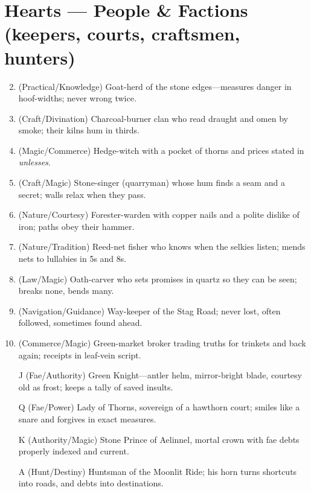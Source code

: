 \section*{Hearts --- People \& Factions (keepers, courts, craftsmen, hunters)}
\label{sec:aelinnel-people}
\begin{enumerate}
\setcounter{enumi}{1}
\item (Practical/Knowledge) Goat-herd of the stone edges---measures danger in hoof-widths; never wrong twice.
\item (Craft/Divination) Charcoal-burner clan who read draught and omen by smoke; their kilns hum in thirds.
\item (Magic/Commerce) Hedge-witch with a pocket of thorns and prices stated in \emph{unlesses}.
\item (Craft/Magic) Stone-singer (quarryman) whose hum finds a seam and a secret; walls relax when they pass.
\item (Nature/Courtesy) Forester-warden with copper nails and a polite dislike of iron; paths obey their hammer.
\item (Nature/Tradition) Reed-net fisher who knows when the selkies listen; mends nets to lullabies in 5s and 8s.
\item (Law/Magic) Oath-carver who sets promises in quartz so they can be seen; breaks none, bends many.
\item (Navigation/Guidance) Way-keeper of the Stag Road; never lost, often followed, sometimes found ahead.
\item (Commerce/Magic) Green-market broker trading truths for trinkets and back again; receipts in leaf-vein script.
\item[J] (Fae/Authority) Green Knight---antler helm, mirror-bright blade, courtesy old as frost; keeps a tally of saved insults.
\item[Q] (Fae/Power) Lady of Thorns, sovereign of a hawthorn court; smiles like a snare and forgives in exact measures.
\item[K] (Authority/Magic) Stone Prince of Aelinnel, mortal crown with fae debts properly indexed and current.
\item[A] (Hunt/Destiny) Huntsman of the Moonlit Ride; his horn turns shortcuts into roads, and debts into destinations.
\end{enumerate}

